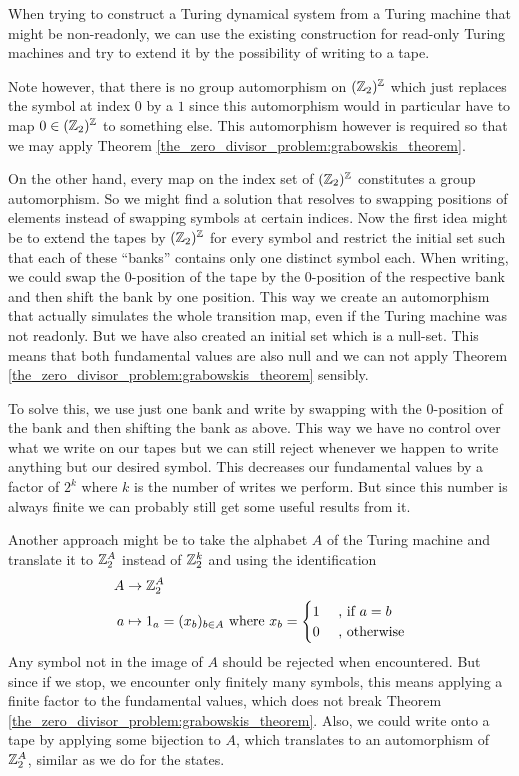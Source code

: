 \begin{Remark}
	\label{remarks:tds_construction}
	When trying to construct a Turing dynamical system from a Turing machine that might be non-readonly, we can use the existing construction for read-only Turing machines and try to extend it by the possibility of writing to a tape.

	Note however, that there is no group automorphism on $(\mathbb{Z}_2)^{\mathbb{Z}}$ which just replaces the symbol at index $0$ by a $1$ since this automorphism would in particular have to map $0 \in (\mathbb{Z}_2)^{\mathbb{Z}}$ to something else.
	This automorphism however is required so that we may apply Theorem \ref{the_zero_divisor_problem:grabowskis_theorem}.

	On the other hand, every map on the index set of $(\mathbb{Z}_2)^{\mathbb{Z}}$ constitutes a group automorphism. So we might find a solution that resolves to swapping positions of elements instead of swapping symbols at certain indices.
	Now the first idea might be to extend the tapes by $(\mathbb{Z}_2)^{\mathbb{Z}}$ for every symbol and restrict the initial set such that each of these ``banks'' contains only one distinct symbol each.
	When writing, we could swap the $0$-position of the tape by the $0$-position of the respective bank and then shift the bank by one position.
	This way we create an automorphism that actually simulates the whole transition map, even if the Turing machine was not readonly.
	But we have also created an initial set which is a null-set. This means that both fundamental values are also null and we can not apply Theorem \ref{the_zero_divisor_problem:grabowskis_theorem} sensibly.

	To solve this, we use just one bank and write by swapping with the $0$-position of the bank and then shifting the bank as above.
	This way we have no control over what we write on our tapes but we can still reject whenever we happen to write anything but our desired symbol. This decreases our fundamental values by a factor of $2^k$ where $k$ is the number of writes we perform. But since this number is always finite we can probably still get some useful results from it.

	Another approach might be to take the alphabet $A$ of the Turing machine and translate it to $\mathbb{Z}_2^A$ instead of $\mathbb{Z}_2^k$ and using the identification
	\begin{align*}
		A &\to \mathbb{Z}_2^A \\
		a &\mapsto 1_a = (x_b)_{b \in A} ~\text{where}~ x_b = \begin{cases} 1 &~\text{, if}~ a = b \\ 0 &~\text{, otherwise} \end{cases}
	\end{align*}
	Any symbol not in the image of $A$ should be rejected when encountered.
	But since if we stop, we encounter only finitely many symbols, this means applying a finite factor to the fundamental values, which does not break Theorem \ref{the_zero_divisor_problem:grabowskis_theorem}.
	Also, we could write onto a tape by applying some bijection to $A$, which translates to an automorphism of $\mathbb{Z}_2^A$, similar as we do for the states.
\end{Remark}

